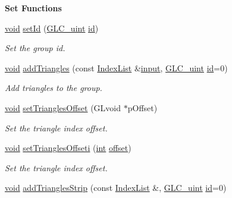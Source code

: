 \begin{Indent}{\bf Set Functions}\par
\begin{DoxyCompactItemize}
\item 
\hyperlink{group___u_a_v_objects_plugin_ga444cf2ff3f0ecbe028adce838d373f5c}{void} \hyperlink{class_g_l_c___primitive_group_af25cd2eab7890e7a7e10d450b3c365c7}{set\-Id} (\hyperlink{glc__global_8h_abf950976fabed69026558df8e2da6c6b}{G\-L\-C\-\_\-uint} \hyperlink{glext_8h_a58c2a664503e14ffb8f21012aabff3e9}{id})
\begin{DoxyCompactList}\small\item\em Set the group id. \end{DoxyCompactList}\item 
\hyperlink{group___u_a_v_objects_plugin_ga444cf2ff3f0ecbe028adce838d373f5c}{void} \hyperlink{class_g_l_c___primitive_group_a434ed7046e72911a2b18fe8374ad1f9f}{add\-Triangles} (const \hyperlink{glc__global_8h_a92568854751d0cfbc27eae9c76aab7cf}{Index\-List} \&\hyperlink{glext_8h_ad3c78daa7d8673f71649d4840c641779}{input}, \hyperlink{glc__global_8h_abf950976fabed69026558df8e2da6c6b}{G\-L\-C\-\_\-uint} \hyperlink{glext_8h_a58c2a664503e14ffb8f21012aabff3e9}{id}=0)
\begin{DoxyCompactList}\small\item\em Add triangles to the group. \end{DoxyCompactList}\item 
\hyperlink{group___u_a_v_objects_plugin_ga444cf2ff3f0ecbe028adce838d373f5c}{void} \hyperlink{class_g_l_c___primitive_group_a9d419e442600682ef8f66a96178d6f13}{set\-Triangles\-Offset} (G\-Lvoid $\ast$p\-Offset)
\begin{DoxyCompactList}\small\item\em Set the triangle index offset. \end{DoxyCompactList}\item 
\hyperlink{group___u_a_v_objects_plugin_ga444cf2ff3f0ecbe028adce838d373f5c}{void} \hyperlink{class_g_l_c___primitive_group_ad3a4c20daeeb75fa689e43cfa01b35b2}{set\-Triangles\-Offseti} (\hyperlink{ioapi_8h_a787fa3cf048117ba7123753c1e74fcd6}{int} \hyperlink{glext_8h_ae1b92ae085ddef4b1cdca7d749339fb0}{offset})
\begin{DoxyCompactList}\small\item\em Set the triangle index offset. \end{DoxyCompactList}\item 
\hyperlink{group___u_a_v_objects_plugin_ga444cf2ff3f0ecbe028adce838d373f5c}{void} \hyperlink{class_g_l_c___primitive_group_a4018041ae53fe8aa7b18c706c6ea2007}{add\-Triangles\-Strip} (const \hyperlink{glc__global_8h_a92568854751d0cfbc27eae9c76aab7cf}{Index\-List} \&, \hyperlink{glc__global_8h_abf950976fabed69026558df8e2da6c6b}{G\-L\-C\-\_\-uint} \hyperlink{glext_8h_a58c2a664503e14ffb8f21012aabff3e9}{id}=0)

\end{DoxyCompactItemize}
\end{Indent}
